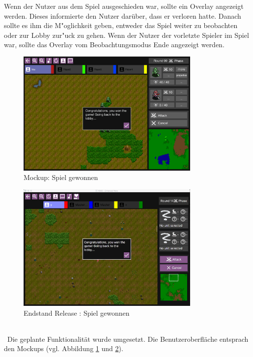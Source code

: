 \documentclass[12pt, titlepage]{scrartcl}
\newcommand{\RN}[1]{%
	\textup{\uppercase\expandafter{\romannumeral#1}}%
}
\newcounter{subsubsubsection}[subsubsection]
\begin{document}
					Wenn der Nutzer aus dem Spiel ausgeschieden war, sollte ein Overlay angezeigt werden. Dieses informierte den Nutzer dar\"uber, dass er verloren hatte. Danach sollte es ihm die M"oglichkeit geben, entweder das Spiel weiter zu beobachten oder zur Lobby zur"uck zu gehen. Wenn der Nutzer der vorletzte Spieler im Spiel war, sollte das Overlay vom Beobachtungsmodus Ende angezeigt werden.
					\begin{figure}[H] 
						\centering
						\includegraphics[width=0.8\textwidth]{images/mockups/GameWon.png}
						\caption{Mockup: Spiel gewonnen}
						\label{Game_Won_2}
					\end{figure}
					\begin{figure}[H] 
						\centering
						\includegraphics[width=0.8\textwidth]{images/endOfRelease/GameWon.png}
						\caption{Endstand Release \RN{3}: Spiel gewonnen}
						\label{End_Game_Won}
					\end{figure}
					\ \\ \ Die geplante Funktionalit\"at wurde umgesetzt. Die Benutzeroberfl\"ache entsprach den Mockups (vgl. Abbildung \ref{Game_Won_2} und \ref{End_Game_Won}).
\end{document}

